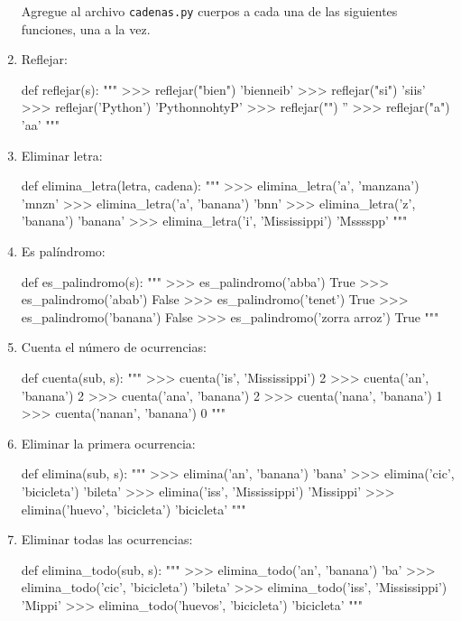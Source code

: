 \begin{enumerate}
Agregue al archivo \verb+cadenas.py+ cuerpos a cada una de las siguientes
funciones, una a la vez.
\item Reflejar:
\begin{pythoncode}
  def reflejar(s):
    """
      >>> reflejar("bien")
      'bienneib'
      >>> reflejar("si")
      'siis'
      >>> reflejar('Python')
      'PythonnohtyP'
      >>> reflejar("")
      ''
      >>> reflejar("a")
      'aa'
    """
\end{pythoncode}
\item Eliminar letra:
\begin{pythoncode}
  def elimina_letra(letra, cadena):
    """
      >>> elimina_letra('a', 'manzana')
      'mnzn'
      >>> elimina_letra('a', 'banana')
      'bnn'
      >>> elimina_letra('z', 'banana')
      'banana'
      >>> elimina_letra('i', 'Mississippi')
      'Msssspp'
    """
\end{pythoncode}
\item Es palíndromo:
\begin{pythoncode}
  def es_palindromo(s):
    """
      >>> es_palindromo('abba')
      True
      >>> es_palindromo('abab')
      False
      >>> es_palindromo('tenet')
      True
      >>> es_palindromo('banana')
      False
      >>> es_palindromo('zorra arroz')
      True
    """
\end{pythoncode}
\item Cuenta el número de ocurrencias:
\begin{pythoncode}
  def cuenta(sub, s):
    """
      >>> cuenta('is', 'Mississippi')
      2
      >>> cuenta('an', 'banana')
      2
      >>> cuenta('ana', 'banana')
      2
      >>> cuenta('nana', 'banana')
      1
      >>> cuenta('nanan', 'banana')
      0
    """
\end{pythoncode}
\item Eliminar la primera ocurrencia: 
\begin{pythoncode}
  def elimina(sub, s):
    """
      >>> elimina('an', 'banana')
      'bana'
      >>> elimina('cic', 'bicicleta')
      'bileta'
      >>> elimina('iss', 'Mississippi')
      'Missippi'
      >>> elimina('huevo', 'bicicleta')
      'bicicleta'
    """
\end{pythoncode}
\item Eliminar todas las ocurrencias:
\begin{pythoncode}
  def elimina_todo(sub, s):
    """
      >>> elimina_todo('an', 'banana')
      'ba'
      >>> elimina_todo('cic', 'bicicleta')
      'bileta'
      >>> elimina_todo('iss', 'Mississippi')
      'Mippi'
      >>> elimina_todo('huevos', 'bicicleta')
      'bicicleta'
    """
\end{pythoncode}
\end{enumerate}

